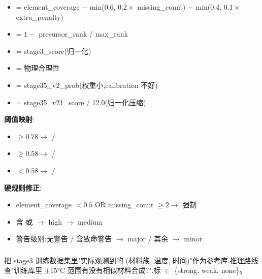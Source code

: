 \begin{itemize}
    \item {} = element\_coverage $-$ min(0.6, $0.2 \times$ missing\_count) $-$ min(0.4, $0.1 \times$ extra\_penalty)
    \item {} = $1 - $ precursor\_rank / max\_rank
    \item {} = stage3\_score(归一化)
    \item {} = 物理合理性
    \item {} = stage35\_v2\_prob(权重小,calibration 不好)
    \item {} = stage35\_v21\_score / 12.0(归一化压缩)
\end{itemize}

\textbf{阈值映射}:
\begin{itemize}
    \item $\geq 0.78 \to$  / 
    \item $\geq 0.58 \to$  / 
    \item $< 0.58 \to$  / 
\end{itemize}

\textbf{硬规则修正}:
\begin{itemize}
    \item element\_coverage $< 0.5$ OR missing\_count $\geq 2 \to$ 强制 
    \item 含  或  $\to$ high $\to$ medium
    \item 警告级别:无警告 / 含致命警告 $\to$ major / 其余 $\to$ minor
\end{itemize}

\subsubsection{}

把 stage3 训练数据集里"实际观测到的 (材料族, 温度, 时间)"作为参考库,推理路线查"训练库里 $\pm 15$°C 范围有没有相似材料合成?",标  $\in$ \{strong, weak, none\}。

\subsubsection{}

